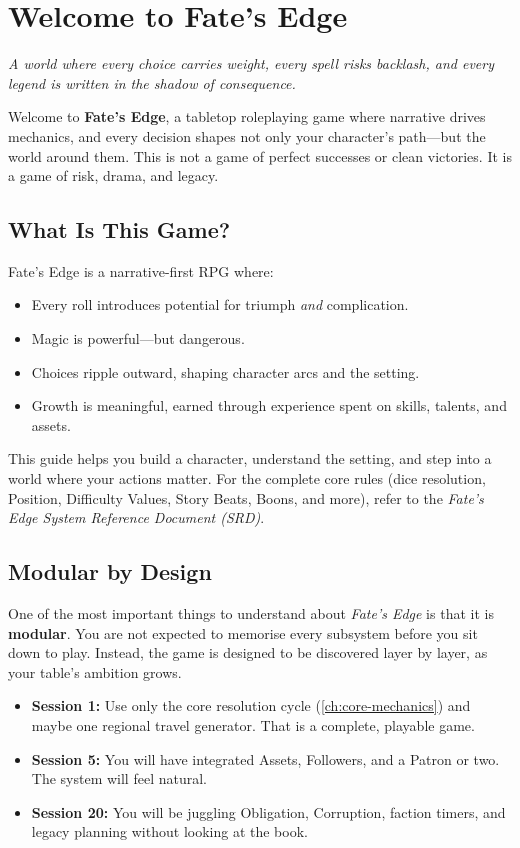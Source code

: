 \chapter{Welcome to Fate's Edge}
\label{ch:intro}

\emph{A world where every choice carries weight, every spell risks backlash, and every legend is written in the shadow of consequence.}

Welcome to \textbf{Fate's Edge}, a tabletop roleplaying game where narrative drives mechanics, and every decision shapes not only your character's path---but the world around them. This is not a game of perfect successes or clean victories. It is a game of risk, drama, and legacy.

\section*{What Is This Game?}

Fate's Edge is a narrative-first RPG where:
\begin{itemize}
\item Every roll introduces potential for triumph \emph{and} complication.
\item Magic is powerful---but dangerous.
\item Choices ripple outward, shaping character arcs and the setting.
\item Growth is meaningful, earned through experience spent on skills, talents, and assets.
\end{itemize}

This guide helps you build a character, understand the setting, and step into a world where your actions matter. For the complete core rules (dice resolution, Position, Difficulty Values, Story Beats, Boons, and more), refer to the \textit{Fate's Edge System Reference Document (SRD)}.

\section*{Modular by Design}

One of the most important things to understand about \textit{Fate's Edge} is that it is \textbf{modular}. You are not expected to memorise every subsystem before you sit down to play. Instead, the game is designed to be discovered layer by layer, as your table's ambition grows.

\begin{itemize}
  \item \textbf{Session 1:} Use only the core resolution cycle (\autoref{ch:core-mechanics}) and maybe one regional travel generator. That is a complete, playable game.
  \item \textbf{Session 5:} You will have integrated Assets, Followers, and a Patron or two. The system will feel natural.
  \item \textbf{Session 20:} You will be juggling Obligation, Corruption, faction timers, and legacy planning without looking at the book.
\end{itemize}

